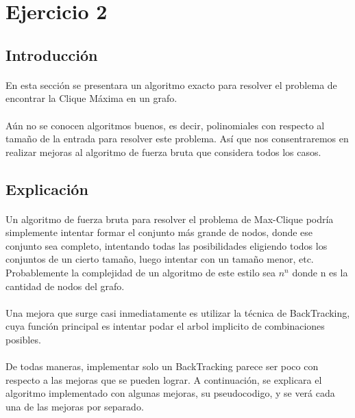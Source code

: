 \section{Ejercicio 2}

\subsection{Introducción}

\paragraph{}
En esta sección se presentara un algoritmo exacto para resolver el problema de encontrar la Clique Máxima en un grafo.

\paragraph{}
Aún no se conocen algoritmos buenos, es decir, polinomiales con respecto al tamaño de la entrada para resolver 
este problema. Así que nos consentraremos en realizar mejoras al algoritmo de fuerza bruta que considera todos los casos.


\subsection{Explicación}
\label{explicacion2}
\paragraph{}
Un algoritmo de fuerza bruta para resolver el problema de Max-Clique podría simplemente intentar formar el conjunto más 
grande de nodos, donde ese conjunto sea completo, intentando todas las posibilidades eligiendo todos los conjuntos de un cierto tamaño,
luego intentar con un tamaño menor, etc. Probablemente la complejidad de un algoritmo de este estilo sea $n^n$ donde n es la cantidad 
de nodos del grafo.

\paragraph{}
Una mejora que surge casi inmediatamente es utilizar la técnica de BackTracking, cuya función principal es intentar podar el 
arbol implicito de combinaciones posibles. 

\paragraph{}
De todas maneras, implementar solo un BackTracking parece ser poco con respecto a las mejoras que se pueden lograr. A continuación, se explicara el algoritmo implementado con algunas mejoras, su pseudocodigo, y se verá cada una de las mejoras por separado.


